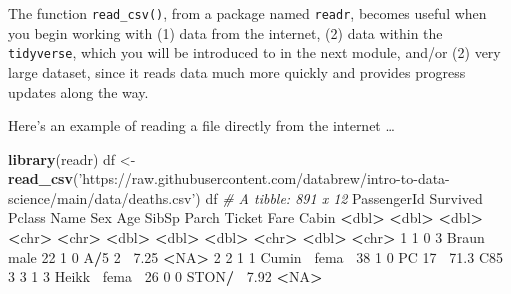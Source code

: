\documentclass[]{book}
\newenvironment{Shaded}{\begin{snugshade}}{\end{snugshade}}
\newcommand{\CommentTok}[1]{\textcolor[rgb]{0.56,0.35,0.01}{\textit{#1}}}
\newcommand{\DecValTok}[1]{\textcolor[rgb]{0.00,0.00,0.81}{#1}}
\newcommand{\ErrorTok}[1]{\textcolor[rgb]{0.64,0.00,0.00}{\textbf{#1}}}
\newcommand{\FloatTok}[1]{\textcolor[rgb]{0.00,0.00,0.81}{#1}}
\newcommand{\KeywordTok}[1]{\textcolor[rgb]{0.13,0.29,0.53}{\textbf{#1}}}
\newcommand{\NormalTok}[1]{#1}
\newcommand{\OperatorTok}[1]{\textcolor[rgb]{0.81,0.36,0.00}{\textbf{#1}}}
\newcommand{\OtherTok}[1]{\textcolor[rgb]{0.56,0.35,0.01}{#1}}
\newcommand{\StringTok}[1]{\textcolor[rgb]{0.31,0.60,0.02}{#1}}
\begin{document}
The function \texttt{read\_csv()}, from a package named \texttt{readr}, becomes useful when you begin working with (1) data from the internet, (2) data within the \texttt{tidyverse}, which you will be introduced to in the next module, and/or (2) very large dataset, since it reads data much more quickly and provides progress updates along the way.

Here's an example of reading a file directly from the internet \ldots{}

\begin{Shaded}
\begin{Highlighting}[]
\KeywordTok{library}\NormalTok{(readr)}
\NormalTok{df <-}\StringTok{ }\KeywordTok{read_csv}\NormalTok{(}\StringTok{'https://raw.githubusercontent.com/databrew/intro-to-data-science/main/data/deaths.csv'}\NormalTok{)}
\NormalTok{df}
\CommentTok{# A tibble: 891 x 12}
\NormalTok{   PassengerId Survived Pclass Name   Sex     Age SibSp Parch Ticket  Fare Cabin}
         \OperatorTok{<}\NormalTok{dbl}\OperatorTok{>}\StringTok{    }\ErrorTok{<}\NormalTok{dbl}\OperatorTok{>}\StringTok{  }\ErrorTok{<}\NormalTok{dbl}\OperatorTok{>}\StringTok{ }\ErrorTok{<}\NormalTok{chr}\OperatorTok{>}\StringTok{  }\ErrorTok{<}\NormalTok{chr}\OperatorTok{>}\StringTok{ }\ErrorTok{<}\NormalTok{dbl}\OperatorTok{>}\StringTok{ }\ErrorTok{<}\NormalTok{dbl}\OperatorTok{>}\StringTok{ }\ErrorTok{<}\NormalTok{dbl}\OperatorTok{>}\StringTok{ }\ErrorTok{<}\NormalTok{chr}\OperatorTok{>}\StringTok{  }\ErrorTok{<}\NormalTok{dbl}\OperatorTok{>}\StringTok{ }\ErrorTok{<}\NormalTok{chr}\OperatorTok{>}
\StringTok{ }\DecValTok{1}           \DecValTok{1}        \DecValTok{0}      \DecValTok{3}\NormalTok{ Braun}\OperatorTok{~}\StringTok{ }\NormalTok{male     }\DecValTok{22}     \DecValTok{1}     \DecValTok{0}\NormalTok{ A}\OperatorTok{/}\DecValTok{5} \DecValTok{2}\OperatorTok{~}\StringTok{  }\FloatTok{7.25} \OperatorTok{<}\OtherTok{NA}\OperatorTok{>}\StringTok{ }
\StringTok{ }\DecValTok{2}           \DecValTok{2}        \DecValTok{1}      \DecValTok{1}\NormalTok{ Cumin}\OperatorTok{~}\StringTok{ }\NormalTok{fema}\OperatorTok{~}\StringTok{    }\DecValTok{38}     \DecValTok{1}     \DecValTok{0}\NormalTok{ PC }\DecValTok{17}\OperatorTok{~}\StringTok{ }\FloatTok{71.3}\NormalTok{  C85  }
 \DecValTok{3}           \DecValTok{3}        \DecValTok{1}      \DecValTok{3}\NormalTok{ Heikk}\OperatorTok{~}\StringTok{ }\NormalTok{fema}\OperatorTok{~}\StringTok{    }\DecValTok{26}     \DecValTok{0}     \DecValTok{0}\NormalTok{ STON}\OperatorTok{/}\ErrorTok{~}\StringTok{  }\FloatTok{7.92} \OperatorTok{<}\OtherTok{NA}\OperatorTok{>}\StringTok{ }

\end{Highlighting}
\end{Shaded}
\end{document}
